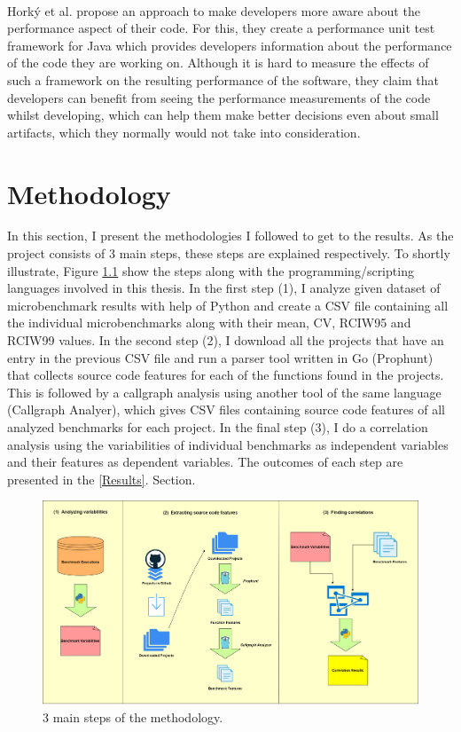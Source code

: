 \documentclass{seal_thesis}
\begin{document}
\\
Hork\'{y} et al. \cite{Horky:2015:UPU:2668930.2688051} propose an approach to make developers more aware about the performance aspect of their code. For this, they create a performance unit test framework for Java which provides developers information about the performance of the code they are working on. Although it is hard to measure the effects of such a framework on the resulting performance of the software, they claim that developers can benefit from seeing the performance measurements of the code whilst developing, which can help them make better decisions even about small artifacts, which they normally would not take into consideration.\\

\chapter{Methodology}
\label{Methodology}
In this section, I present the methodologies I followed to get to the results. As the project consists of 3 main steps, these steps are explained respectively. To shortly illustrate, Figure \ref{fig:Methodology} show the steps along with the programming/scripting languages involved in this thesis. In the first step (1), I analyze given dataset of microbenchmark results with help of Python and create a CSV file containing all the individual microbenchmarks along with their mean, CV, RCIW95 and RCIW99 values. In the second step (2), I download all the projects that have an entry in the previous CSV file and run a parser tool written in Go (Prophunt) that collects source code features for each of the functions found in the projects. This is followed by a callgraph analysis using another tool of the same language (Callgraph Analyer), which gives CSV files containing source code features of all analyzed benchmarks for each project. In the final step (3), I do a correlation analysis using the variabilities of individual benchmarks as independent variables and their features as dependent variables. The outcomes of each step are presented in the \ref{Results}. Section.

\begin{figure}[H]
	\centering
	\includegraphics[width=\linewidth]{Methodology}
	\caption{3 main steps of the methodology.}
	\label{fig:Methodology}
\end{figure}
\end{document}
